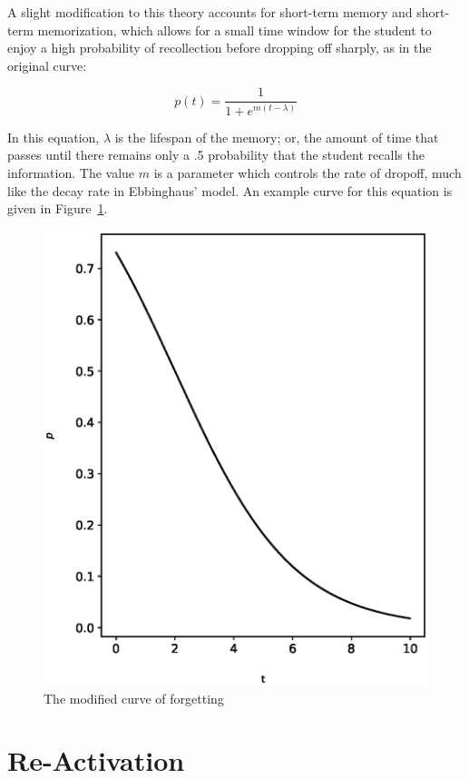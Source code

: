 A slight modification to this theory accounts for short-term memory and
short-term memorization, which allows for a small time window for the student
to enjoy a high probability of recollection before dropping off sharply, as in
the original curve:

\begin{equation}
\label{eq:modified}
 p(t) = \frac{1}{1 + e^{{m(t-\lambda)}}}
\end{equation}

In this equation, $\lambda$ is the lifespan of the memory; or, the amount of
time that passes until there remains only a .5 probability that the student
recalls the information.  The value $m$ is a parameter which controls the rate
of dropoff, much like the decay rate in Ebbinghaus' model.  An example curve
for this equation is given in Figure~\ref{fig:modified}.

\begin{figure}[p!]
 \label{fig:modified}
 \includegraphics{fig/modified.eps} 
 \caption{The modified curve of forgetting}
\end{figure}

\section{Re-Activation}

